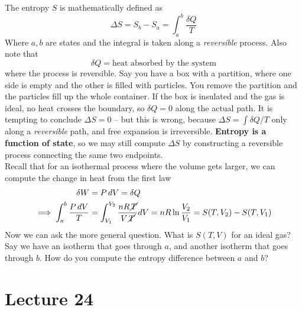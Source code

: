 \documentclass{report}
\numberwithin{equation}{section}
\begin{document}
The entropy $S$ is mathematically defined as
\begin{equation}
    \Delta S = S_b - S_a = \int^b_a \frac{\delta Q}{T}
\end{equation}
Where $a,b$ are states and the integral is taken along a \emph{reversible} process. Also note that
\begin{equation*}
    \delta Q = \text{heat absorbed by the system}
\end{equation*}
where the process is reversible. Say you have a box with a partition, where one side is empty and the other is filled with particles. You remove the partition and the particles fill up the whole container. If the
box is insulated and the gas is ideal, no heat crosses the boundary, so $\delta Q = 0$ along the actual path. It is tempting to conclude $\Delta S = 0$ -- but this is wrong, because $\Delta S = \int\delta Q/T$ only along a \emph{reversible} path, and free expansion is irreversible. \textbf{Entropy is a function of state}, so we may still compute $\Delta S$ by constructing a reversible process connecting the same two endpoints.\\

\noindent Recall that for an isothermal process where the volume gets larger, we can compute the change in heat from the first law
\begin{align*}
    \delta W &= P\, dV = \delta Q\\
    \implies \int^b_a \frac{P\, dV}{T} &= \int^{V_2}_{V_1}\frac{nR\,\cancel T}{V\,\cancel T}dV = nR\ln \frac{V_2}{V_1} = S(T,V_2) - S(T,V_1)
\end{align*}
Now we can ask the more general question. What is $S(T,V)$ for an ideal gas? Say we have an isotherm that goes through $a$, and another isotherm that goes through $b$. How do you compute the entropy difference between $a$ and $b$?
\section{Lecture 24}
\end{document}
